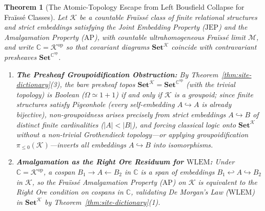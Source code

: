 \documentclass[10pt,twoside,openright]{book}
\theoremstyle{crmplain}
\newtheorem{theorem}{Theorem}[section]
\theoremstyle{crmdef}
\theoremstyle{crmremark}
\newcommand{\lean}[1]{\ignorespaces}
\newcommand{\leanwitness}{\ignorespaces}
\begin{document}
\begin{theorem}[The Atomic-Topology Escape from Left Bousfield Collapse for Fraïssé Classes]\label{thm:fraisse-atomic-escape}%
\lean{HomotopyCRM.sap_closed_oriented_poset, HomotopyCRM.steiner_cycle_obstruction, HomotopyCRM.IsFlowReachReflecting.toIsClosedEmbedding, HomotopyCRM.IsFlowConvex.toIsFlowReachReflecting, HomotopyCRM.sap_flowReachReflecting, HomotopyCRM.sap_flowConvex}%
\leanwitness%
%
Let $\mathcal{K}$ be a countable Fraïssé class of finite relational structures and strict embeddings satisfying the Joint Embedding Property ($\mathrm{JEP}$) and the Amalgamation Property ($\mathrm{AP}$), with countable ultrahomogeneous Fraïssé limit $\mathcal{M}$, and write $\mathbb{C} = \mathcal{K}^{\mathrm{op}}$ so that covariant diagrams $\mathbf{Set}^{\mathcal{K}}$ coincide with contravariant presheaves $\mathbf{Set}^{\mathbb{C}^{\mathrm{op}}}$.
\begin{enumerate}[label=(\arabic*),leftmargin=2em]
  \item \textbf{The Presheaf Groupoidification Obstruction:} By Theorem~\ref{thm:site-dictionary}(3), the bare presheaf topos $\mathbf{Set}^{\mathcal{K}} = \mathbf{Set}^{\mathbb{C}^{\mathrm{op}}}$ (with the trivial topology) is Boolean ($\Omega \simeq 1+1$) if and only if $\mathcal{K}$ is a groupoid; since finite structures satisfy Pigeonhole (every self-embedding $A \hookrightarrow A$ is already bijective), non-groupoidness arises precisely from strict embeddings $A \hookrightarrow B$ of distinct finite cardinalities ($|A| < |B|$), and forcing classical logic onto $\mathbf{Set}^{\mathcal{K}}$ without a non-trivial Grothendieck topology---or applying groupoidification $\pi_{\le 0}(\mathcal{K})$---inverts all embeddings $A \hookrightarrow B$ into isomorphisms.
  \item \textbf{Amalgamation as the Right Ore Residuum for $\mathrm{WLEM}$:} Under $\mathbb{C} = \mathcal{K}^{\mathrm{op}}$, a cospan $B_1 \to A \leftarrow B_2$ in $\mathbb{C}$ is a span of embeddings $B_1 \hookleftarrow A \hookrightarrow B_2$ in $\mathcal{K}$, so the Fraïssé Amalgamation Property ($\mathrm{AP}$) on $\mathcal{K}$ is equivalent to the Right Ore condition on cospans in $\mathbb{C}$, validating De Morgan's Law ($\mathrm{WLEM}$) in $\mathbf{Set}^{\mathcal{K}}$ by Theorem~\ref{thm:site-dictionary}(1).

\end{enumerate}
\end{theorem}
\end{document}
